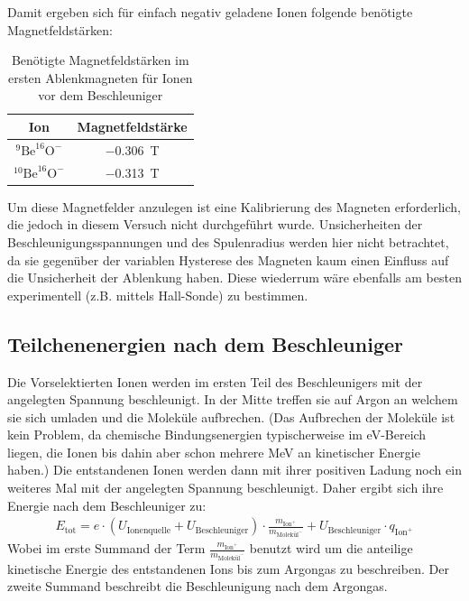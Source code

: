 Damit ergeben sich für einfach negativ geladene Ionen folgende benötigte Magnetfeldstärken:
\begin{table}[h]
  \centering
  \begin{tabular}{|c|c|}
    \hline
    Ion & Magnetfeldstärke \\
    \hline
    $^{9}\text{Be}^{16}\text{O}^{-}$ & \SI{-0.306}{\tesla} \\
    \hline
    $^{10}\text{Be}^{16}\text{O}^{-}$ & \SI{-0.313}{\tesla} \\
    \hline
  \end{tabular}
  \caption{Benötigte Magnetfeldstärken im ersten Ablenkmagneten für Ionen vor dem Beschleuniger}
  \label{Auswertung_tab_Ionenenergien_vor_Besch}
\end{table}
Um diese Magnetfelder anzulegen ist eine Kalibrierung des Magneten erforderlich, die jedoch in diesem Versuch nicht durchgeführt wurde.
Unsicherheiten der Beschleunigungsspannungen und des Spulenradius werden hier nicht betrachtet, da sie gegenüber der variablen Hysterese des Magneten kaum einen Einfluss auf die Unsicherheit der Ablenkung haben.
Diese wiederrum wäre ebenfalls am besten experimentell (z.B. mittels Hall-Sonde) zu bestimmen.

\subsection{Teilchenenergien nach dem Beschleuniger}
Die Vorselektierten Ionen werden im ersten Teil des Beschleunigers mit der angelegten Spannung beschleunigt.
In der Mitte treffen sie auf Argon an welchem sie sich umladen und die Moleküle aufbrechen.
(Das Aufbrechen der Moleküle ist kein Problem, da chemische Bindungsenergien typischerweise im \si{\electronvolt}-Bereich liegen, die Ionen bis dahin aber schon mehrere \si{\mega\electronvolt} an kinetischer Energie haben.)
Die entstandenen Ionen werden dann mit ihrer positiven Ladung noch ein weiteres Mal mit der angelegten Spannung beschleunigt.
Daher ergibt sich ihre Energie nach dem Beschleuniger zu:
\begin{gather}
    E_{\text{tot}} = e \cdot (U_{\text{Ionenquelle}} + U_{\text{Beschleuniger}}) \cdot \frac{m_{\text{Ion}^{+}}}{m_{\text{Molekül}^{-}}} + U_{\text{Beschleuniger}} \cdot q_{\text{Ion}^{+}}
\end{gather}
Wobei im erste Summand der Term $\frac{m_{\text{Ion}^{+}}}{m_{\text{Molekül}^{-}}}$ benutzt wird um die anteilige kinetische Energie des entstandenen Ions bis zum Argongas zu beschreiben.
Der zweite Summand beschreibt die Beschleunigung nach dem Argongas.

